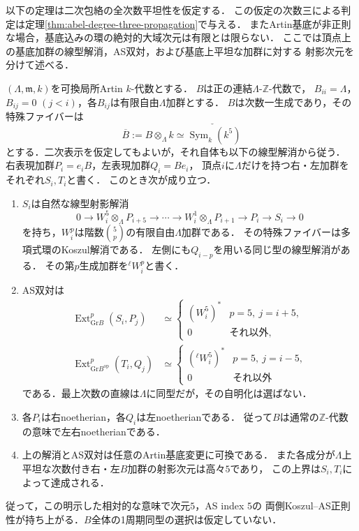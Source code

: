 以下の定理は二次包絡の全次数平坦性を仮定する．
この仮定の次数三による判定は定理\ref{thm:abel-degree-three-propagation}で与える．
またArtin基底が非正則な場合，基底込みの環の絶対的大域次元は有限とは限らない．
ここでは頂点上の基底加群の線型解消，AS双対，および基底上平坦な加群に対する
射影次元を分けて述べる．

\begin{theorem}[相対Koszul解消と両側AS双対の持上げ]
\label{thm:abel-relative-as-lift}
$(\Lambda,\mathfrak m,k)$を可換局所Artin $k$-代数とする．
$B$は正の連結$\Lambda$-$\mathbb Z$-代数で，
$B_{ii}=\Lambda$，$B_{ij}=0$ $(j<i)$，各$B_{ij}$は有限自由$\Lambda$加群とする．
$B$は次数一生成であり，その特殊ファイバーは
\[
 \overline B:=B\otimes_\Lambda k
       \simeq\check{\operatorname{Sym}_k(k^5)}
\]
とする．二次表示を仮定してもよいが，それ自体も以下の線型解消から従う．
右表現加群$P_i=e_iB$，左表現加群$Q_i=Be_i$，
頂点$i$に$\Lambda$だけを持つ右・左加群をそれぞれ$S_i,T_i$と書く．
このとき次が成り立つ．
\begin{enumerate}
\item $S_i$は自然な線型射影解消
\begin{equation}\label{eq:abel-relative-right-resolution}
 0\longrightarrow W_i^5\otimes_\Lambda P_{i+5}
 \longrightarrow\cdots\longrightarrow W_i^1\otimes_\Lambda P_{i+1}
 \longrightarrow P_i\longrightarrow S_i\longrightarrow0
\end{equation}
を持ち，$W_i^p$は階数$\binom5p$の有限自由$\Lambda$加群である．
その特殊ファイバーは多項式環のKoszul解消である．
左側にも$Q_{i-p}$を用いる同じ型の線型解消がある．
その第$p$生成加群を${}^\ell W_i^p$と書く．
\item AS双対は
\begin{align}
 \operatorname{Ext}^p_{\mathrm{Gr}B}(S_i,P_j)
  &\simeq
   \begin{cases}
    (W_i^5)^* & p=5,\ j=i+5,\\
    0 & \text{それ以外},
   \end{cases}
   \label{eq:abel-relative-right-as}\\
 \operatorname{Ext}^p_{\mathrm{Gr}B^{\mathrm{op}}}(T_i,Q_j)
  &\simeq
   \begin{cases}
    ({}^\ell W_i^5)^* & p=5,\ j=i-5,\\
    0 & \text{それ以外}
   \end{cases}
   \label{eq:abel-relative-left-as}
\end{align}
である．最上次数の直線は$\Lambda$に同型だが，その自明化は選ばない．
\item 各$P_i$は右noetherian，各$Q_i$は左noetherianである．
従って$B$は通常の$\mathbb Z$-代数の意味で左右noetherianである．
\item 上の解消とAS双対は任意のArtin基底変更に可換である．
また各成分が$\Lambda$上平坦な次数付き右・左$B$加群の射影次元は高々$5$であり，
この上界は$S_i,T_i$によって達成される．
\end{enumerate}
従って，この明示した相対的な意味で次元$5$，AS index $5$の
両側Koszul--AS正則性が持ち上がる．$B$全体の1周期同型の選択は仮定していない．
\end{theorem}
